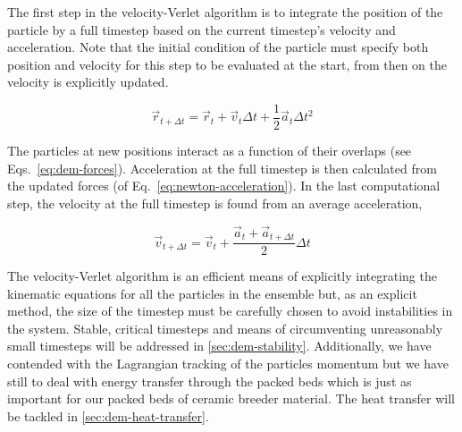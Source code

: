The first step in the velocity-Verlet algorithm is to integrate the position of the particle by a full timestep based on the current timestep's velocity and acceleration. Note that the initial condition of the particle must specify both position and velocity for this step to be evaluated at the start, from then on the velocity is explicitly updated.

\begin{equation}
	\vec{r}_{t+\Delta t} = \vec{r}_t + \vec{v}_t\Delta t + \frac{1}{2}\vec{a}_t\Delta t^2
\end{equation}

The particles at new positions interact as a function of their overlaps (see Eqs.~\ref{eq:dem-forces}). Acceleration at the full timestep is then calculated from the updated forces (of Eq.~\ref{eq:newton-acceleration}). In the last computational step, the velocity at the full timestep is found from an average acceleration,

\begin{equation}
	\vec{v}_{t+\Delta t} = \vec{v}_t + \frac{\vec{a}_t + \vec{a}_{t+\Delta t}}{2}\Delta t
\end{equation}

The velocity-Verlet algorithm is an efficient means of explicitly integrating the kinematic equations for all the particles in the ensemble but, as an explicit method, the size of the timestep must be carefully chosen to avoid instabilities in the system. Stable, critical timesteps and means of circumventing unreasonably small timesteps will be addressed in \cref{sec:dem-stability}. Additionally, we have contended with the Lagrangian tracking of the particles momentum but we have still to deal with energy transfer through the packed beds which is just as important for our packed beds of ceramic breeder material. The heat transfer will be tackled in \cref{sec:dem-heat-transfer}.